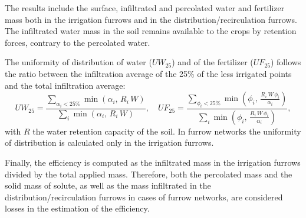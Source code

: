 \documentclass[review,authoryear]{elsarticle}
\newcommand{\eq}[2]{\begin{equation}\label{#2}#1\end{equation}}
\newcommand{\PA}[1] {\left(#1\right)}
\begin{document}
The results include the surface, infiltrated and percolated water and fertilizer
mass both in the irrigation furrows and in the distribution/recirculation
furrows. The infiltrated water mass in the soil remains available to the
crops by retention forces, contrary to the percolated water.

The uniformity of distribution of water ($UW_{25}$) and of the fertilizer
($UF_{25}$) follows the ratio between the infiltration average of the 25\% of
the less irrigated points and the total infiltration average:
\eq
{
	UW_{25}=\frac{\displaystyle\sum_{\alpha_i<25\%}\min\PA{\alpha_i,\,R_i\,W}}
		{\displaystyle\sum_i\min\PA{\alpha_i,\,R_i\,W}},\quad
	UF_{25}=\frac{\displaystyle
		\sum_{\phi_i<25\%}\min\PA{\phi_i,\,\frac{R_i\,W\,\phi_i}{\alpha_i}}}
		{\displaystyle\sum_i\min\PA{\phi_i,\,\frac{R_i\,W\,\phi_i}{\alpha_i}}},
}{EqUniformity}
with $R$ the water retention capacity of the soil. In furrow networks the
uniformity of distribution is calculated only in the irrigation furrows.

Finally, the efficiency is computed as the infiltrated mass in the irrigation
furrows divided by the total applied mass. Therefore, both the percolated mass
and the solid mass of solute, as well as the mass infiltrated in the
distribution/recirculation furrows in cases of furrow networks, are considered
losses in the estimation of the efficiency. 
\end{document}
